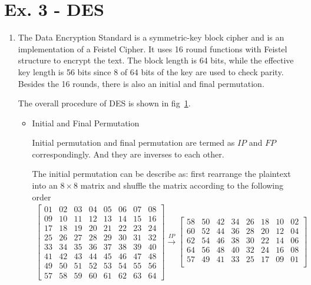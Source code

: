 \documentclass[11pt,a4paper]{article}
\newcommand{\image}[3]{
	\begin{figure}[!ht]
		\centering
	    \texttt{[image: \#2]}
		\caption{#3}
		\label{fig:#2}
	\end{figure}
}
\begin{document}
\section*{Ex. 3 - DES}
\begin{enumerate}
	\image{0.7}{DES}{DES scheme.}
	\item The Data Encryption Standard is a symmetric-key block cipher and is an implementation of a Feistel Cipher. It uses 16 round functions with Feistel structure to encrypt the text. The block length is 64 bits, while the effective key length is 56 bits since 8 of 64 bits of the key are used to check parity. Besides the 16 rounds, there is also an initial and final permutation.
	\par The overall procedure of DES is shown in fig~\ref{fig:DES}.
	\begin{itemize}
		\item Initial and Final Permutation
		\par Initial permutation and final permutation are termed as $\mathit{IP}$ and $\mathit{FP}$ correspondingly. And they are inverses to each other.
		\par The initial permutation can be describe as: first rearrange the plaintext into an $8\times 8$ matrix and shuffle the matrix according to the following order
		\begin{align*}
			\begin{bmatrix}
				01 & 02 & 03 & 04 & 05 & 06 & 07 & 08 \\
				09 & 10 & 11 & 12 & 13 & 14 & 15 & 16 \\
				17 & 18 & 19 & 20 & 21 & 22 & 23 & 24 \\
				25 & 26 & 27 & 28 & 29 & 30 & 31 & 32 \\
				33 & 34 & 35 & 36 & 37 & 38 & 39 & 40 \\
				41 & 42 & 43 & 44 & 45 & 46 & 47 & 48 \\
				49 & 50 & 51 & 52 & 53 & 54 & 55 & 56 \\
				57 & 58 & 59 & 60 & 61 & 62 & 63 & 64
			\end{bmatrix}
			\xrightarrow{IP}
			\begin{bmatrix}
				58 & 50 & 42 & 34 & 26 & 18 & 10 & 02 \\
				60 & 52 & 44 & 36 & 28 & 20 & 12 & 04 \\
				62 & 54 & 46 & 38 & 30 & 22 & 14 & 06 \\
				64 & 56 & 48 & 40 & 32 & 24 & 16 & 08 \\
				57 & 49 & 41 & 33 & 25 & 17 & 09 & 01 \\

\end{bmatrix}
\end{align*}
\end{itemize}
\end{enumerate}
\end{document}
